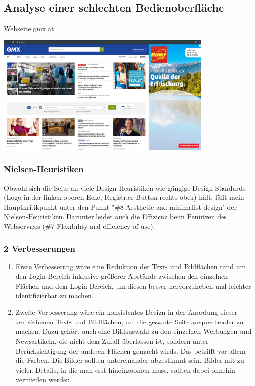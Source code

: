 \documentclass[11pt]{article}
\begin{document}
\subsection{Analyse einer schlechten Bedienoberfläche}
\label{sec:orgf0a6343}

Webseite gmx.at

\begin{center}
\includegraphics[width=400px]{./img/gmxat.png}
\end{center}

\subsubsection{Nielsen-Heuristiken}
\label{sec:org24dd2ee}

Obwohl sich die Seite an viele Design-Heuristiken wie gängige
Design-Standards (Logo in der linken oberen Ecke,
Registrier-Button rechts oben) hält, fällt mein Hauptkritikpunkt
unter den Punkt "\#8 Aesthetic and minimalist design" der
Nielsen-Heuristiken. Darunter leidet auch die Effizienz beim
Benützen des Webservices (\#7 Flexibility and efficiency of use).

\subsubsection{2 Verbesserungen}
\label{sec:org954f426}
\begin{enumerate}
\item Erste Verbesserung wäre eine Reduktion der Text- und
Bildflächen rund um den Login-Bereich inklusive größerer
Abstände zwischen den einzelnen Flächen und dem Login-Bereich,
um diesen besser hervorzuheben und leichter identifizierbar zu
machen.
\item Zweite Verbesserung wäre ein konsistentes Design in der
Anordung dieser verbliebenen Text- und Bildflächen, um die
gesamte Seite ansprechender zu machen. Dazu gehört auch eine
Bildauswahl zu den einzelnen Werbungen und Newsartikeln, die
nicht dem Zufall überlassen ist, sondern unter Berücksichtigung
der anderen Flächen gemacht wirds. Das betrifft vor allem die
Farben. Die Bilder sollten untereinander abgestimmt
sein. Bilder mit zu vielen Details, in die man erst
hineinzoomen muss, sollten dabei ohnehin vermieden werden.
\end{enumerate}
\end{document}

